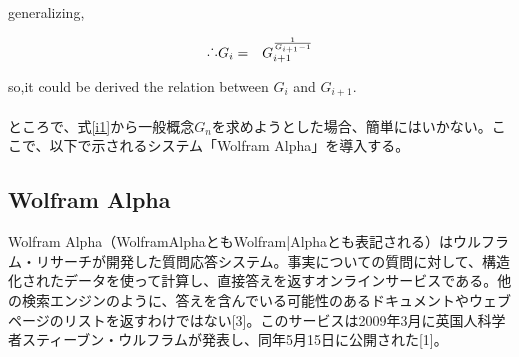 generalizing,

\begin{eqnarray}
\raisebox{.2ex}{.}\raisebox{1.2ex}{.}\raisebox{.2ex}{.} G_{i}&=&G_{i+1}^{\frac{1}{G_{i+1}-1}}
 \label{i1}
 \end{eqnarray}

so,it could be  derived the relation between $G_{i}$ and $G_{i+1}$.\\
\\
ところで、式\ref{i1}から一般概念$G_{n}$を求めようとした場合、簡単にはいかない。ここで、以下で示されるシステム「Wolfram Alpha」を導入する。\\

\subsection{Wolfram Alpha}
Wolfram Alpha（WolframAlphaともWolfram|Alphaとも表記される）はウルフラム・リサーチが開発した質問応答システム。事実についての質問に対して、構造化されたデータを使って計算し、直接答えを返すオンラインサービスである。他の検索エンジンのように、答えを含んでいる可能性のあるドキュメントやウェブページのリストを返すわけではない[3]。このサービスは2009年3月に英国人科学者スティーブン・ウルフラムが発表し、同年5月15日に公開された[1]。
